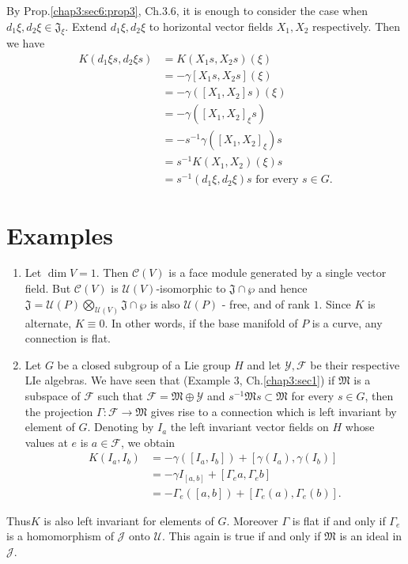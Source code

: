 By Prop.\ref{chap3:sec6:prop3}, Ch.3.6, it is enough to consider the case when $d_1 \xi,
d_2 \xi \in \mathfrak{J}_\xi$. Extend $d_1 \xi, d_2 \xi$ to horizontal
vector fields $X_1, X_2$ respectively. Then we have 
\begin{align*}
  K(d_1 \xi s, d_2 \xi s) & = K(X_1 s, X_2 s) (\xi)\\
  & = - \gamma [X_1 s, X_2 s] (\xi)\\
  & = - \gamma ([X_1, X_2] s) (\xi)\\
  & = - \gamma ([X_1, X_2]_\xi s)\\
  & = - s^{-1} \gamma ([X_1,X_2]_\xi)s\\
  & = s^{-1} K(X_1,X_2) (\xi) s\\
  & = s^{-1} (d_1 \xi, d_2 \xi)s \text{ for every } s \in G.
\end{align*}\pageoriginale

\section{Examples}\label{chap3:sec7}%

\begin{enumerate}
\item Let $\dim V = 1$. Then $\mathscr{C}(V)$ is a face module
  generated by a single vector field. But $\mathscr{C}(V)$ is
  $\mathscr{U}(V)$-isomorphic to $ \mathfrak{J} \cap \wp$ and hence
  $\mathfrak{J} =\mathscr{U} (P)\bigotimes \limits_{\mathscr{U}(V)}
  \mathfrak{J} \cap \wp$ is also $\mathscr{U}(P)$ - free, and of rank
  $1$. Since $K$ is alternate, $K \equiv 0$. In other words, if the
  base manifold of $P$ is a curve, any connection is flat. 
\item Let $G$ be a closed subgroup of a Lie group $H$ and  let $
  \mathscr{Y}, \mathscr{F}$ be their respective LIe algebras. We have
  seen that (Example 3, Ch.\ref{chap3:sec1}) if $\mathfrak{M}$ is a subspace of
  $\mathscr{F}$ such that $\mathscr{F} = \mathfrak{M} \oplus
  \mathscr{Y}$ and $s^{-1} \mathfrak{M} s \subset \mathfrak{M}$ for
  every $s \in G$, then the projection $\Gamma : \mathscr{F}
  \rightarrow \mathfrak{M}$ gives rise to a connection which is left
  invariant by element of $G$. Denoting by $I_a$ the left invariant
  vector fields on $H$ whose values at $e$ is $a \in \mathscr{F}$, we
  obtain 
  \begin{align*}
    K(I_a,I_b) & = - \gamma([I_a,I_b]) + [\gamma(I_a), \gamma(I_b)]\\
    & = - \gamma I_{[a,b]} + [\Gamma_e a, \Gamma_e b]\\
    & = - \Gamma_e ([a,b]) + [\Gamma_e (a), \Gamma_e(b)].
  \end{align*}
\end{enumerate}

Thus\pageoriginale $K$ is also left invariant for elements of $G$. Moreover $\Gamma$
is flat if and only if $\Gamma_e$ is a homomorphism of $\mathscr{J}$
onto $\mathscr{U}$. This again is true if and only if $\mathfrak{M}$
is an ideal in $\mathscr{J}$. 


